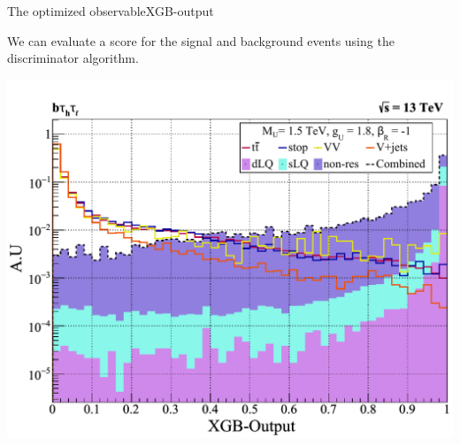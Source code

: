 \documentclass{../bredelebeamer}
\begin{document}
\begin{frame}{The optimized observable}{XGB-output}

	We can evaluate a score for the signal and background events using the discriminator algorithm. 

	\begin{center}
		\includegraphics[width=.75\linewidth]{ML_semileptonic_sLQ_wRHC.pdf}
	\end{center}
		
\end{frame}
\end{document}
